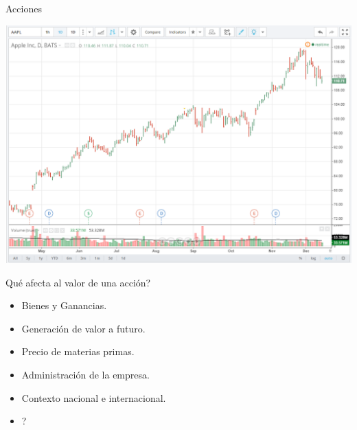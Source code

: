 \documentclass[12pt,aspectratio=169]{beamer}
\begin{document}
\begin{frame}{Acciones}
	\begin{center}
		\includegraphics[width=.65\paperwidth]{tradingview.png}
	\end{center}
\end{frame}

\begin{frame}{Qué afecta al valor de una acción?}
\begin{itemize}
\item Bienes y Ganancias.
\item Generación de valor a futuro.
\item Precio de materias primas.
\item Administración de la empresa.
\item Contexto nacional e internacional.
\item ?
\end{itemize}
\end{frame}
\end{document}
